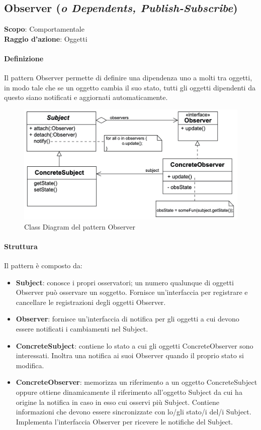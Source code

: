 \subsection{Observer (\textit{o Dependents, Publish-Subscribe})}
\label{observer}

\textbf{Scopo}: Comportamentale \\
\textbf{Raggio d'azione}: Oggetti

\paragraph{Definizione} Il pattern Observer permette di definire una dipendenza uno a molti tra oggetti, in modo tale che se un oggetto cambia il suo stato, tutti gli oggetti dipendenti da questo siano notificati e aggiornati automaticamente.

\begin{figure}[H]
    \centering
    \includegraphics[width=1\linewidth]{assets/pattern/observer/observer-struttura.png}
    \caption{Class Diagram del pattern Observer}
\end{figure}

\paragraph{Struttura} Il pattern è composto da:
\begin{itemize}
    \item \textbf{Subject}: conosce i propri osservatori; un numero qualunque di oggetti Observer può osservare un soggetto. Fornisce un’interfaccia per registrare e cancellare le registrazioni degli oggetti Observer. 
    \item \textbf{Observer}: fornisce un’interfaccia di notifica per gli oggetti a cui devono essere notificati i cambiamenti nel Subject. 
    \item \textbf{ConcreteSubject}: contiene lo stato a cui gli oggetti 
     ConcreteObserver sono interessati. Inoltra una notifica ai suoi Observer quando il proprio stato si modifica. 
    \item \textbf{ConcreteObserver}: memorizza un riferimento a un oggetto ConcreteSubject oppure ottiene dinamicamente il riferimento all’oggetto Subject da cui ha origine la notifica in caso in esso cui osservi più Subject. Contiene informazioni che devono essere sincronizzate con lo/gli stato/i del/i Subject. Implementa l’interfaccia Observer per ricevere le notifiche del Subject.
\end{itemize}

